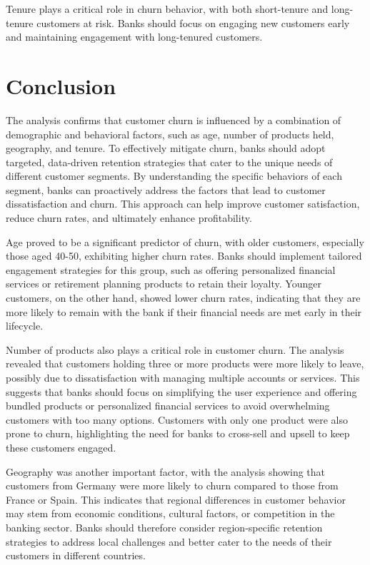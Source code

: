 \documentclass[12pt]{article}
\begin{document}
\textbf{}Tenure plays a critical role in churn behavior, with both short-tenure and long-tenure customers at risk. Banks should focus on engaging new customers early and maintaining engagement with long-tenured customers.

\section{Conclusion}
The analysis confirms that customer churn is influenced by a combination of demographic and behavioral factors, such as age, number of products held, geography, and tenure. To effectively mitigate churn, banks should adopt targeted, data-driven retention strategies that cater to the unique needs of different customer segments. By understanding the specific behaviors of each segment, banks can proactively address the factors that lead to customer dissatisfaction and churn. This approach can help improve customer satisfaction, reduce churn rates, and ultimately enhance profitability.

Age proved to be a significant predictor of churn, with older customers, especially those aged 40-50, exhibiting higher churn rates. Banks should implement tailored engagement strategies for this group, such as offering personalized financial services or retirement planning products to retain their loyalty. Younger customers, on the other hand, showed lower churn rates, indicating that they are more likely to remain with the bank if their financial needs are met early in their lifecycle.

Number of products also plays a critical role in customer churn. The analysis revealed that customers holding three or more products were more likely to leave, possibly due to dissatisfaction with managing multiple accounts or services. This suggests that banks should focus on simplifying the user experience and offering bundled products or personalized financial services to avoid overwhelming customers with too many options. Customers with only one product were also prone to churn, highlighting the need for banks to cross-sell and upsell to keep these customers engaged.

Geography was another important factor, with the analysis showing that customers from Germany were more likely to churn compared to those from France or Spain. This indicates that regional differences in customer behavior may stem from economic conditions, cultural factors, or competition in the banking sector. Banks should therefore consider region-specific retention strategies to address local challenges and better cater to the needs of their customers in different countries.
\end{document}
